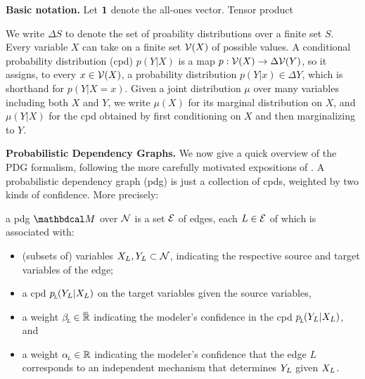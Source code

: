 \documentclass[twoside]{article}
\begin{document}
\textbf{Basic notation.}
Let $\mathbf{1}$ denote the all-ones vector.
Tensor product

We write $\Delta S$ to denote the set of proability distributions over a finite set $S$.
Every variable $X$ can take on a finite set $\mathcal V(X)$ of possible values. 
A conditional probability distribution (cpd) $p(Y|X)$ is a map 
$p : \mathcal V(X) \to \Delta \mathcal V(Y)$, so it assigns, to every $x \in \mathcal V(X)$, a probability distribution $p(Y|x) \in \Delta Y$, which is shorthand for $p(Y|X\!\!=\!x)$.
Given a joint distribution $\mu$ over many variables including both $X$ and $Y$, 
we write $\mu(X)$ for its marginal distribution on $X$, and $\mu(Y|X)$ for the cpd obtained by first conditioning on $X$ and then marginalizing to $Y$. 


\textbf{Probabilistic Dependency Graphs.}
We now give a quick overview of the PDG formalism,
following the more carefully motivated
expositions of \textcite{pdg-aaai,one-true-loss}.
%
%
A probabilistic dependency graph (pdg) is just a collection of cpds, weighted by two kinds of confidence. More precisely:

\begin{defn}
    a pdg $\dg M
    $
    over $\mathcal N$ is a set $\mathcal E$ of edges, 
    each $L \in \mathcal E$ of which is associated with:
    \begin{itemize}[nosep]
        \item (subsets of) variables $X_{{L}}, Y_{{L}} \subset \mathcal N$, indicating the respective source and target variables of the edge;
        \item a cpd $p_{\!_{L}\!} (Y_{{L}} | X_{{L}})$ on the target variables given the source variables,
        \item a weight $\beta_{\!_{L}\!} \in \mskip1mu\overline{\mskip-1mu\mathbb R\!}\,$ indicating 
            the modeler's confidence in the cpd $p_{\!_{L}\!}(Y_{{L}} | X_{{L}})$, and 
        \item a weight $\alpha_{\!_{L}\!} \in \mathbb R$ indicating 
            the modeler's confidence that the edge $L$ corresponds to an independent mechanism that determines $Y_{{L}}$ given $X_{{L}}$. 
        \qedhere
    \end{itemize}
\end{defn}
\end{document}
